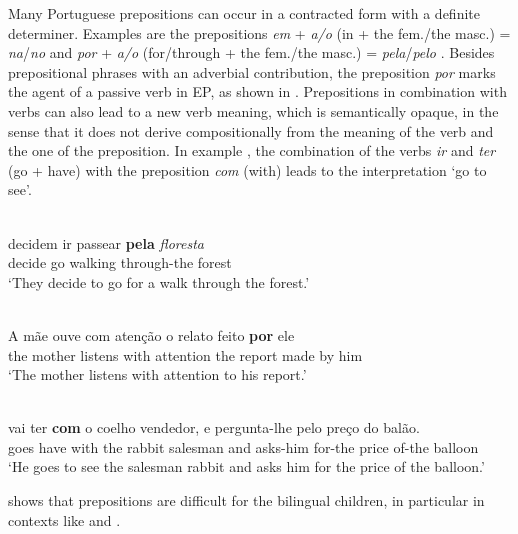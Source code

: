 \documentclass[output=paper]{langscibook}
\begin{document}
Many Portuguese prepositions can occur in a contracted form with a definite determiner. Examples are the prepositions \textit{em} + \textit{a/o} (in + the fem.\slash the masc.) = \textit{na}\slash\textit{no} and \textit{por} + \textit{a/o} (for\slash through + the fem.\slash the masc.) = \textit{pela}\slash\textit{pelo} . Besides prepositional phrases with an adverbial contribution, the preposition \textit{por} marks the agent of a passive verb in EP, as shown in . Prepositions in combination with verbs can also lead to a new verb meaning, which is semantically opaque, in the sense that it does not derive compositionally from the meaning of the verb and the one of the preposition. In example , the combination of the verbs \textit{ir} and \textit{ter} (go + have) with the preposition \textit{com} (with) leads to the interpretation ‘go to see’.

\ea%
\label{ex:rinke:3}
\ea\label{ex:rinke:3a}\relax[item 2]\\
\gll decidem ir  passear \textbf{pela} \textit{floresta}\\
  decide    go walking through-the forest\\
\glt `They decide to go for a walk through the forest.’

\ex\label{ex:rinke:3b}\relax [item 34]\\
\gll A  mãe       ouve com atenção     o relato    feito \textbf{por} ele\\
 the mother listens with attention the report made by him\\
\glt `The mother listens with attention to his report.’

\ex\label{ex:rinke:3c}\relax[item 35]\\
\gll vai   ter \textbf{com} o coelho vendedor, e    pergunta-lhe pelo     preço do balão.\\
  goes have with the rabbit salesman and asks-him       for-the price of-the balloon\\
\glt `He goes to see the salesman rabbit and asks him for the price of the balloon.’
\z
\z

\noindent
{} shows that prepositions are difficult for the bilingual children, in particular in contexts like  and .
\end{document}

